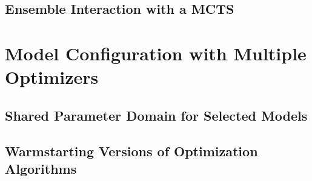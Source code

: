 \Blindtext

\subsection{Ensemble Interaction with a MCTS}
\label{sec:appraoch:selection:mcts}

\Blindtext

\section{Model Configuration with Multiple Optimizers}
\label{sec:approach:configuration}

\Blindtext

\subsection{Shared Parameter Domain for Selected Models}
\label{sec:appraoch:configuration:parameter}

\Blindtext

\subsection{Warmstarting Versions of Optimization Algorithms}
\label{sec:appraoch:configuration:warmstart}

\Blindtext